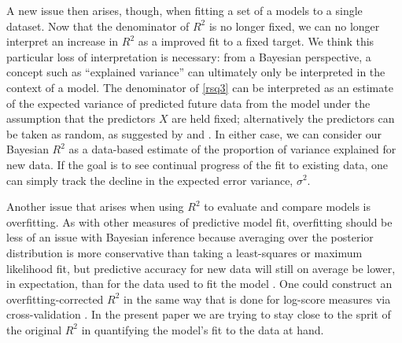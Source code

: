 \documentclass[11pt]{article}
\begin{document}
A new issue then arises, though, when fitting a set of a models to a single dataset.  Now that the denominator of $R^2$ is no longer fixed, we can no longer interpret an increase in $R^2$ as a improved fit to a fixed target.  We think this particular loss of interpretation is necessary:  from a Bayesian perspective, a concept such as ``explained variance'' can ultimately only be interpreted in the context of a model.  The denominator of \eqref{rsq3} can be interpreted as an estimate of the expected variance of predicted future data from the model under the assumption that the predictors $X$ are held fixed; alternatively the predictors can be taken as random, as suggested by \cite{Helland1987} and \cite{Tjur2009}.  In either case, we can consider our Bayesian $R^2$ as a data-based estimate of the proportion of variance explained for new data. If the goal is to see continual progress of the fit to existing data, one can simply track the decline in the expected error variance, $\sigma^2$.


Another issue that arises when using $R^2$ to evaluate and compare models is overfitting.  As with other measures of predictive model fit, overfitting should be less of an issue with Bayesian inference because averaging over the posterior distribution is more conservative than taking a least-squares or maximum likelihood fit, but predictive accuracy for new data will still on average be lower, in expectation, than for the data used to fit the model \citep{GelmanHwangVehtari2014}.
One could construct an overfitting-corrected $R^2$ in the same way that is done for log-score measures via cross-validation \citep{VehtariGelmanGabry2017}. In the present paper we are trying to stay close to the sprit of the original $R^2$ in quantifying the model's fit to the data at hand.
\end{document}
